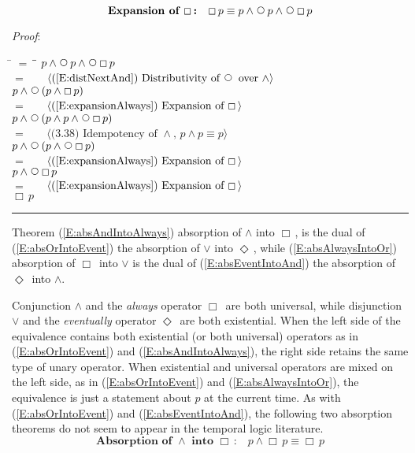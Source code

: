 \documentclass[12pt, fleqn, leqno]{article}
\newcommand{\lgap}{2pt}                             %
\newcommand{\mymathindent}{24pt}                    %
\newcommand{\Next}{\;\,\text{\raisebox{3.5pt}{\circle{6}}}}
\newcommand{\Event}{\Diamond\,}
\newcommand{\Always}{\Box\,}
\newcommand{\myqed}{\rule[-.23ex]{1.2ex}{2.0ex}}
\newcommand{\myqedtab}{\hspace{384pt}}              %
\newcommand{\Gll} {\langle}                         %
\newcommand{\Ggg} {\rangle}                         %
\newcommand{\Hint}[1]     {\ \ \ $\Gll              \mbox{#1} \Ggg$ }   %
\begin{document}
\begin{equation}\label{E:expansionAlways2}
\textbf{Expansion of $\Always$:}\quad \Always p \equiv p \land \Next p \land \Next\Always p
\end{equation}

\emph{Proof}:
\begin{tabbing}
\hspace{\mymathindent} \= $= \;$ \= \myqedtab \= \kill
  \> \>   $p \land \Next p \land \Next\Always p$\\[\lgap]
  \> $=$  \>  \Hint{(\ref{E:distNextAnd}) Distributivity of $\Next$ over $\land$}\\[\lgap]
  \> \>   $p \land \Next (p \land \Always p)$\\[\lgap]
  \> $=$  \>  \Hint{(\ref{E:expansionAlways}) Expansion of $\Always$}\\[\lgap]
  \> \>   $p \land \Next (p \land p \land \Next \Always p)$\\[\lgap]
  \> $=$  \>  \Hint{(3.38) Idempotency of $\land$, $p\land p \equiv p$}\\[\lgap]
  \> \>   $p \land \Next (p \land \Next \Always p)$\\[\lgap]
  \> $=$  \>  \Hint{(\ref{E:expansionAlways}) Expansion of $\Always$}\\[\lgap]
  \> \>   $p \land \Next \Always p$\\[\lgap]
  \> $=$  \>  \Hint{(\ref{E:expansionAlways}) Expansion of $\Always$}\\[\lgap]
  \> \>   $\Always p$ \quad \myqed
\end{tabbing}

Theorem (\ref{E:absAndIntoAlways}) absorption of $\land$ into $\Always$,
is the dual of (\ref{E:absOrIntoEvent}) the absorption of $\lor$ into $\Event$,
while (\ref{E:absAlwaysIntoOr}) absorption of $\Always$ into $\lor$ is the dual of
(\ref{E:absEventIntoAnd}) the absorption of $\Event$ into $\land$.

Conjunction $\land$ and the \textit{always} operator $\Always$ are both universal, while
disjunction $\lor$ and the \textit{eventually} operator $\Event$ are both existential.
When the left side of the equivalence contains both existential (or both universal) operators as in (\ref{E:absOrIntoEvent}) and (\ref{E:absAndIntoAlways}),
the right side retains the same type of unary operator.
When existential and universal operators are mixed on the left side,
as in (\ref{E:absOrIntoEvent}) and (\ref{E:absAlwaysIntoOr}), the equivalence is just a statement about $p$ at the current time.
As with (\ref{E:absOrIntoEvent}) and (\ref{E:absEventIntoAnd}), the following two absorption theorems
do not seem to appear in the temporal logic literature.
\begin{equation}\label{E:absAndIntoAlways}
\textbf{Absorption of $\land$ into $\Always$:}\quad p \land \Always p \equiv \Always p
\end{equation}
\end{document}
